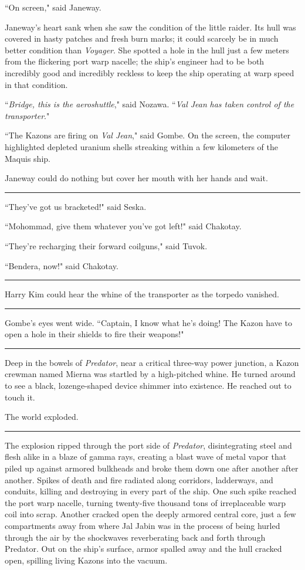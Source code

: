 \documentclass[twoside,letterpaper,12pt]{memoir}
\begin{document}
``On screen," said Janeway.

Janeway's heart sank when she saw the condition of the little raider. Its hull was covered in hasty patches and fresh burn marks; it could scarcely be in much better condition than \textit{Voyager}. She spotted a hole in the hull just a few meters from the flickering port warp nacelle; the ship's engineer had to be both incredibly good and incredibly reckless to keep the ship operating at warp speed in that condition.

``\textit{Bridge, this is the aeroshuttle}," said Nozawa. ``\textit{Val Jean} \textit{has taken control of the transporter}."

``The Kazons are firing on \textit{Val Jean}," said Gombe. On the screen, the computer highlighted depleted uranium shells streaking within a few kilometers of the Maquis ship.

Janeway could do nothing but cover her mouth with her hands and wait.

\fancybreak{\rule{3cm}{0.4 pt}}
``They've got us bracketed!" said Seska.

``Mohommad, give them whatever you've got left!" said Chakotay.

``They're recharging their forward coilguns," said Tuvok.

``Bendera, now!" said Chakotay.

\fancybreak{\rule{3cm}{0.4 pt}}
Harry Kim could hear the whine of the transporter as the torpedo vanished.

\fancybreak{\rule{3cm}{0.4 pt}}
Gombe's eyes went wide. ``Captain, I know what he's doing! The Kazon have to open a hole in their shields to fire their weapons!"

\fancybreak{\rule{3cm}{0.4 pt}}
Deep in the bowels of \textit{Predator}, near a critical three-way power junction, a Kazon crewman named Mierna was startled by a high-pitched whine. He turned around to see a black, lozenge-shaped device shimmer into existence. He reached out to touch it.

The world exploded.

\fancybreak{\rule{3cm}{0.4 pt}}
The explosion ripped through the port side of \textit{Predator}, disintegrating steel and flesh alike in a blaze of gamma rays, creating a blast wave of metal vapor that piled up against armored bulkheads and broke them down one after another after another. Spikes of death and fire radiated along corridors, ladderways, and conduits, killing and destroying in every part of the ship. One such spike reached the port warp nacelle, turning twenty-five thousand tons of irreplaceable warp coil into scrap. Another cracked open the deeply armored central core, just a few compartments away from where Jal Jabin was in the process of being hurled through the air by the shockwaves reverberating back and forth through Predator. Out on the ship's surface, armor spalled away and the hull cracked open, spilling living Kazons into the vacuum.
\end{document}
